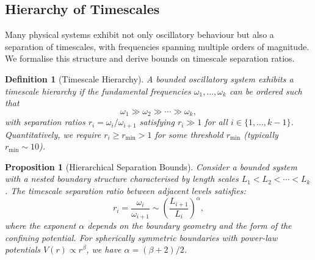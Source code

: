 \documentclass[twocolumn,10pt,a4paper]{article}
\newtheorem{proposition}[theorem]{Proposition}
\newtheorem{definition}[theorem]{Definition}
\theoremstyle{remark}
\begin{document}
\subsection{Hierarchy of Timescales}

Many physical systems exhibit not only oscillatory behaviour but also a separation of timescales, with frequencies spanning multiple orders of magnitude. We formalise this structure and derive bounds on timescale separation ratios.

\begin{definition}[Timescale Hierarchy]
\label{def:timescale_hierarchy}
A bounded oscillatory system exhibits a \emph{timescale hierarchy} if the fundamental frequencies $\omega_1, \ldots, \omega_k$ can be ordered such that
\begin{equation}
\omega_1 \gg \omega_2 \gg \cdots \gg \omega_k,
\end{equation}
with separation ratios $r_i = \omega_i / \omega_{i+1}$ satisfying $r_i \gg 1$ for all $i \in \{1, \ldots, k-1\}$. Quantitatively, we require $r_i \geq r_{\min} > 1$ for some threshold $r_{\min}$ (typically $r_{\min} \sim 10$).
\end{definition}

\begin{proposition}[Hierarchical Separation Bounds]
\label{prop:hierarchy_bounds}
Consider a bounded system with a nested boundary structure characterised by length scales $L_1 < L_2 < \cdots < L_k$. The timescale separation ratio between adjacent levels satisfies:
\begin{equation}
r_i = \frac{\omega_i}{\omega_{i+1}} \sim \left(\frac{L_{i+1}}{L_i}\right)^{\alpha},
\end{equation}
where the exponent $\alpha$ depends on the boundary geometry and the form of the confining potential. For spherically symmetric boundaries with power-law potentials $V(r) \propto r^\beta$, we have $\alpha = (\beta + 2)/2$.
\end{proposition}
\end{document}

